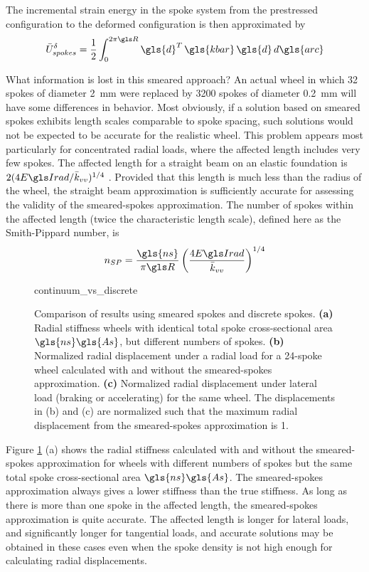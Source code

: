 \documentclass[\rootdir/thesis.tex]{subfiles}
\begin{document}
The incremental strain energy in the spoke system from the prestressed configuration to the deformed configuration is then approximated by
\begin{equation}
\label{eq:dU_spokes_cont}
\bar{U}_{spokes}^{\delta} = \frac{1}{2}\int_0^{2\pi \R} \gls{d}^T\, \gls{kbar}\, \gls{d} \, d\gls{arc}
\end{equation}

What information is lost in this smeared approach? An actual wheel in which 32 spokes of diameter \SI{2}{mm} were replaced by 3200 spokes of diameter \SI{0.2}{mm} will have some differences in behavior. Most obviously, if a solution based on smeared spokes exhibits length scales comparable to spoke spacing, such solutions would not be expected to be accurate for the realistic wheel. This problem appears most particularly for concentrated radial loads, where the affected length includes very few spokes. The affected length for a straight beam on an elastic foundation is $2(4\EIr/\kvv)^{1/4}$ \cite{Hetenyi1946}. Provided that this length is much less than the radius of the wheel, the straight beam approximation is sufficiently accurate for assessing the validity of the smeared-spokes approximation. The number of spokes within the affected length (twice the characteristic length scale), defined here as the Smith-Pippard number, is
\begin{equation}
n_{SP} = \frac{\gls{ns}}{\pi \R} \left(\frac{4\EIr}{\kvv}\right)^{1/4}
\end{equation}

\begin{figure}[t]
\centering
{continuum_vs_discrete}
\caption[Comparison of smeared-spokes and discrete-spokes calculations]{Comparison of results using smeared spokes and discrete spokes. \textbf{(a)} Radial stiffness wheels with identical total spoke cross-sectional area $\gls{ns}\gls{As}$, but different numbers of spokes. \textbf{(b)} Normalized radial displacement under a radial load for a 24-spoke wheel calculated with and without the smeared-spokes approximation. \textbf{(c)} Normalized radial displacement under lateral load (braking or accelerating) for the same wheel. The displacements in (b) and (c) are normalized such that the maximum radial displacement from the smeared-spokes approximation is 1.}
\label{fig:continuum_vs_discrete}
\end{figure}

Figure \ref{fig:continuum_vs_discrete} (a) shows the radial stiffness calculated with and without the smeared-spokes approximation for wheels with different numbers of spokes but the same total spoke cross-sectional area $\gls{ns}\gls{As}$. The smeared-spokes approximation always gives a lower stiffness than the true stiffness. As long as there is more than one spoke in the affected length, the smeared-spokes approximation is quite accurate. The affected length is longer for lateral loads, and significantly longer for tangential loads, and accurate solutions may be obtained in these cases even when the spoke density is not high enough for calculating radial displacements.
\end{document}
